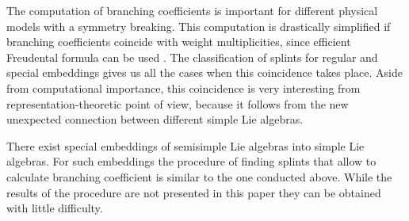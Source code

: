 \documentclass[12pt]{iopart}
\begin{document}
The computation of branching coefficients is important for different physical models with a symmetry
breaking. This computation is drastically simplified if branching coefficients coincide with weight
multiplicities, since efficient Freudental formula can be used \cite{moody1982fast}. The classification
of splints for regular and special embeddings gives us all the cases when this coincidence takes
place. Aside from computational importance, this coincidence is very interesting from
representation-theoretic point of view, because it follows from the new unexpected connection between
different simple Lie algebras. 

There exist special embeddings of semisimple Lie algebras into simple Lie algebras. For such
embeddings the procedure of finding splints that allow to calculate branching coefficient is similar
to the one conducted above. While the results of the procedure are not presented in this paper they
can be obtained with little difficulty.


{} 

\end{document}
